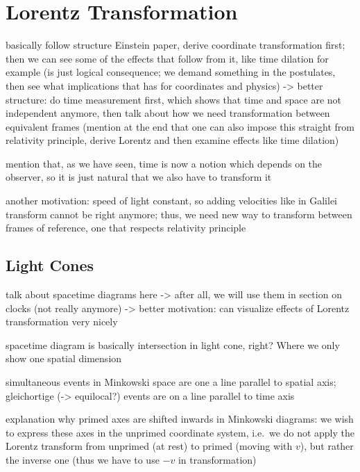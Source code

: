 	\section{Lorentz Transformation}
basically follow structure Einstein paper, derive coordinate transformation first; then we can see some of the effects that follow from it, like time dilation for example (is just logical consequence; we demand something in the postulates, then see what implications that has for coordinates and physics) -> better structure: do time measurement first, which shows that time and space are not independent anymore, then talk about how we need transformation between equivalent frames (mention at the end that one can also impose this straight from relativity principle, derive Lorentz and then examine effects like time dilation)


mention that, as we have seen, time is now a notion which depends on the observer, so it is just natural that we also have to transform it


another motivation: speed of light constant, so adding velocities like in Galilei transform cannot be right anymore; thus, we need new way to transform between frames of reference, one that respects relativity principle



		\subsection{Light Cones}
talk about spacetime diagrams here -> after all, we will use them in section on clocks (not really anymore) -> better motivation: can visualize effects of Lorentz transformation very nicely

spacetime diagram is basically intersection in light cone, right? Where we only show one spatial dimension


simultaneous events in Minkowski space are one a line parallel to spatial axis; gleichortige (-> equilocal?) events are on a line parallel to time axis



explanation why primed axes are shifted inwards in Minkowski diagrams: we wish to express these axes in the unprimed coordinate system, i.e.~we do not apply the Lorentz transform from unprimed (at rest) to primed (moving with $v$), but rather the inverse one (thus we have to use $-v$ in transformation)



